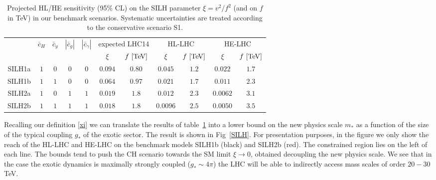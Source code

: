 \begin{table}[t]
\caption{\small Projected HL/HE sensitivity (95\% CL) on the SILH parameter $\xi=v^2/f^2$ (and on $f$ in TeV) in our benchmark scenarios. Systematic uncertainties are treated according to the conservative scenario S1.
\label{bencharkVecchi}}
\begin{center}
{
\begin{tabular}{c|cccc||cc|cc|cc} 
\rule{0pt}{1.2em}%
\multirow{ 2}{*}{} & \multirow{ 2}{*}{$\bar c_H$} & \multirow{ 2}{*}{$\bar c_y$} & \multirow{ 2}{*}{$|\bar c_{g}|$} & \multirow{ 2}{*}{$|\bar c_{\gamma}|$} & \multicolumn{2}{c|}{expected LHC14}  & \multicolumn{2}{c|}{HL-LHC} &  \multicolumn{2}{c}{HE-LHC} \\
&  &   &  &  & $\xi$ & $f~[{\rm TeV}]$  & $\xi$  & $f~[{\rm TeV}]$ &  $\xi$ & $f~[{\rm TeV}]$ \\
\hline
\hline
SILH1a & $1$ & $0$ & $0$ & $0$ & $0.094$ & $0.80$ &      $0.045$ & $1.2$ & $0.022$ & $1.7$ \\
SILH1b &$1$ & $1$ & $0$ & $0$ & $0.064$ & $0.97$ &       $0.021$ & $1.7$ & $0.011$ & $2.3$ \\
\hline
SILH2a &$1$ & $0$ & $1$ & $1$ & $0.019$ & $1.8$ &       $0.012$ & $2.3$ & $0.0062$ & $3.1$\\
SILH2b & $1$ & $1$ & $1$ & $1$ & $0.018$ & $1.8$ &       $0.0096$ & $2.5$ & $0.0050$ & $3.5$ \\
\end{tabular}
}
\end{center}
\end{table}








Recalling our definition \eqref{xi} we can translate the results of table~\ref{bencharkVecchi} into a lower bound on the new physics scale $m_*$ as a function of the size of the typical coupling $g_*$ of the exotic sector. The result is shown in Fig~\ref{SILH}. For presentation purposes, in the figure we only show the reach of the HL-LHC and HE-LHC on the benchmark models SILH1b (black) and SILH2b (red). The constrained region lies on the left of each line. The bounds tend to push the CH scenario towards the SM limit $\xi\to0$, obtained decoupling the new physics scale. We see that in the case the exotic dynamics is maximally strongly coupled ($g_*\sim4\pi$) the LHC will be able to indirectly access mass scales of order $20-30$ TeV.

